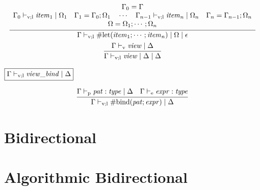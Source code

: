 \begin{gather*}
    \infer{\Gamma \vdash_{\mathrm{v}; \mathrm{l}} \mathrm{\#let}(\mathit{item}_1; \cdots; \mathit{item}_n) \mid \Omega \mid \epsilon}{
        \begin{array}{c}
            \Gamma_0 = \Gamma
            \\
            \Gamma_0 \vdash_{\mathrm{v}; \mathrm{l}} \mathit{item}_1 \mid \Omega_1
            \hspace{1em}
            \Gamma_1 = \Gamma_0; \Omega_1
            \hspace{1em}
            \cdots
            \hspace{1em}
            \Gamma_{n - 1} \vdash_{\mathrm{v}; \mathrm{l}} \mathit{item}_n \mid \Omega_n
            \hspace{1em}
            \Gamma_n = \Gamma_{n - 1}; \Omega_n
            \\
            \Omega = \Omega_1; \cdots; \Omega_n
        \end{array}
    }
    \\
    \infer{\Gamma \vdash_{\mathrm{v}; \mathrm{l}} \mathit{view} \mid \Delta \mid \Delta}{
        \Gamma \vdash_\mathrm{v} \mathit{view} \mid \Delta
    }
\end{gather*}

$\fbox{$\Gamma \vdash_{\mathrm{v}; \mathrm{l}} \mathit{view\_bind} \mid \Delta$}$

\begin{gather*}
    \infer{\Gamma \vdash_{\mathrm{v}; \mathrm{l}} \mathrm{\#bind}(\mathit{pat}; \mathit{expr}) \mid \Delta}{
        \Gamma \vdash_\mathrm{p} \mathit{pat}: \mathit{type} \mid \Delta
        &
        \Gamma \vdash_\mathrm{e} \mathit{expr}: \mathit{type}
    }
\end{gather*}

\section{Bidirectional}

\section{Algorithmic Bidirectional}

